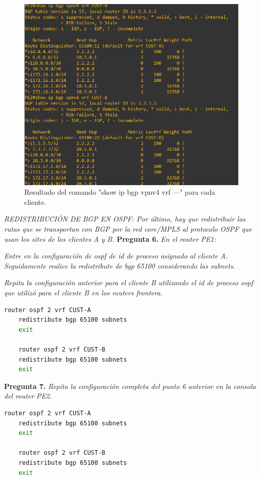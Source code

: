 \documentclass[a4paper, 12pt]{report}
\begin{document}
\begin{figure}[H]
	\centering
	\includegraphics[scale=0.6]{showipbgpNUEVOPE2.png}
	\caption{Resultado del comando "show ip bgp vpnv4 vrf ---" para cada cliente.}
	\label{fig:showipbgpNUEVOPE2}
\end{figure}


\textit{
	REDISTRIBUCIÓN DE BGP EN OSPF:
Por último, hay que redistribuir las rutas que se transportan con BGP por la red core/MPLS al
protocolo OSPF que usan los sites de los clientes A y B.
}
\newpage
\textbf{Pregunta 6.}
\textit{En el router PE1:}

\textit{Entre en la configuración de ospf de id de proceso asignado al cliente A. Seguidamente
realice la redistribute de bgp 65100 considerando las subnets.}

\textit{Repita la configuración anterior para el cliente B utilizando el id de proceso ospf que
utilizó para el cliente B en los routers frontera.}

\begin{lstlisting}[language=bash, caption={Configuración añadida de ospf en PE1}]
	router ospf 2 vrf CUST-A
	redistribute bgp 65100 subnets
	exit

	router ospf 2 vrf CUST-B
	redistribute bgp 65100 subnets
	exit
\end{lstlisting}

\textbf{Pregunta 7.}
\textit{Repita la configuración completa del punto 6 anterior en la consola del router PE2.}

\begin{lstlisting}[language=bash, caption={Configuración añadida de ospf en PE2}]
	router ospf 2 vrf CUST-A
	redistribute bgp 65100 subnets
	exit

	router ospf 2 vrf CUST-B
	redistribute bgp 65100 subnets
	exit
\end{lstlisting}
\end{document}

